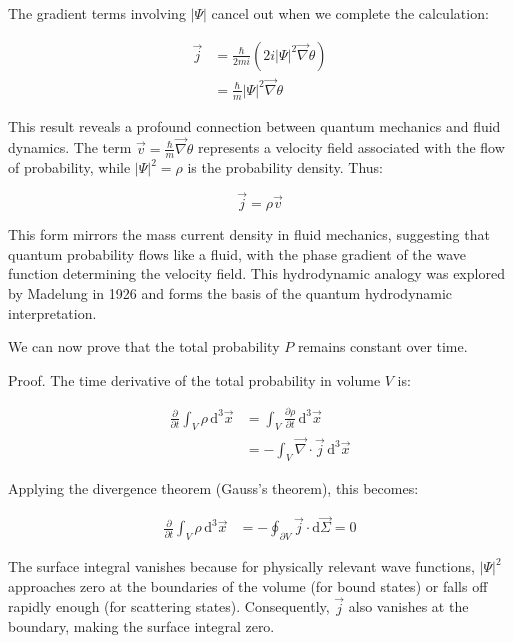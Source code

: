 The gradient terms involving $|\Psi|$ cancel out when we complete the calculation:

\begin{align}
\vec{j} &= \frac{\hbar}{2 m i}\left(2 i|\Psi|^{2} \vec{\nabla} \theta\right) \\
&= \frac{\hbar}{m}|\Psi|^{2} \vec{\nabla} \theta
\end{align}

This result reveals a profound connection between quantum mechanics and fluid dynamics. The term $\vec{v}=\frac{\hbar}{m} \vec{\nabla} \theta$ represents a velocity field associated with the flow of probability, while $|\Psi|^2 = \rho$ is the probability density. Thus:

\begin{equation}
\vec{j}=\rho \vec{v}
\end{equation}

This form mirrors the mass current density in fluid mechanics, suggesting that quantum probability flows like a fluid, with the phase gradient of the wave function determining the velocity field. This hydrodynamic analogy was explored by Madelung in 1926 and forms the basis of the quantum hydrodynamic interpretation.

We can now prove that the total probability $P$ remains constant over time.

Proof. The time derivative of the total probability in volume $V$ is:

\begin{align}
\frac{\partial}{\partial t} \int_{V} \rho \, \mathrm{d}^{3} \vec{x} &= \int_{V} \frac{\partial \rho}{\partial t} \, \mathrm{d}^{3} \vec{x}  \\
&= -\int_{V} \vec{\nabla} \cdot \vec{j} \, \mathrm{d}^{3} \vec{x}
\end{align}

Applying the divergence theorem (Gauss's theorem), this becomes:

\begin{align}
\frac{\partial}{\partial t} \int_{V} \rho \, \mathrm{d}^{3} \vec{x} &= -\oint_{\partial V} \vec{j} \cdot \mathrm{d} \vec{\Sigma} = 0
\end{align}

The surface integral vanishes because for physically relevant wave functions, $|\Psi|^2$ approaches zero at the boundaries of the volume (for bound states) or falls off rapidly enough (for scattering states). Consequently, $\vec{j}$ also vanishes at the boundary, making the surface integral zero.

